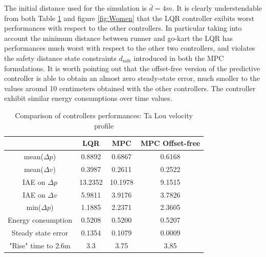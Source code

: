 \documentclass[a4paper,12pt,oneside]{book}
\begin{document}
The initial distance used for the simulation is $\bar{d} = 4m$.
It is clearly understendable from both Table \ref{tab:Ta_Lou} and figure \ref{fig:Women} that the LQR controller exibits worst performances with respect to the other controllers.
In particular taking into account the minimum distance between runner and go-kart the LQR has performances much worst with respect to the other two controllers, and violates the safety distance state constraints $d_{\text{safe}}$ introduced in both the MPC formulations.
It is worth pointing out that the offset-free version of the predictive controller is able to obtain an almost zero steady-state error, much smoller to the values around 10 centimeters obtained with the other controllers.
The controller exhibit similar energy consumptions over time values.

\begin{table}[htbp]
	\centering
	\begin{tabular}{c|c|c|c}
          & \textbf{LQR} & \textbf{MPC} & \textbf{MPC Offset-free} \\
	\hline
	\hline
	mean($\Delta p$) & 0.8892 & 0.6867 &  0.6168 \\
	mean($\Delta v$) & 0.3987 & 0.2611 & 0.2522 \\
	IAE on $\Delta p$ & 13.2352 & 10.1978 & 9.1515 \\
	IAE on $\Delta v$ & 5.9811 & 3.9176 & 3.7826 \\
	min($\Delta p$) & 1.1885 & 2.2371 & 2.3605 \\
	Energy consumption & 0.5208 & 0.5200 & 0.5207 \\
	Steady state error & 0.1354 & 0.1079 & 0.0009 \\
	"Rise" time to 2.6m & 3.3 & 3.75 & 3.85 \\
	\hline
	\end{tabular}
\caption{Comparison of controllers performances: Ta Lou velocity profile }
\label{tab:Ta_Lou}
\end{table}


\newpage
\end{document}
